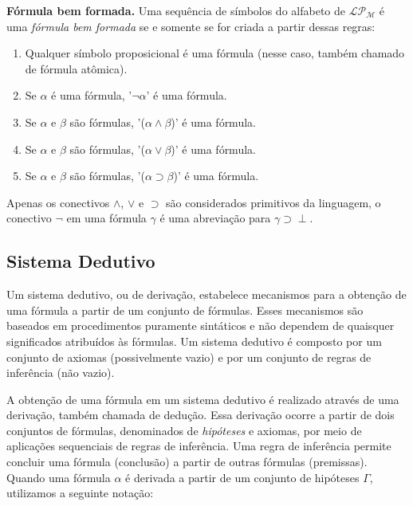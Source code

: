 \begin{definition}{\textbf{Fórmula bem formada.}}
Uma sequência de símbolos do alfabeto de $\mathcal{LP_M}$ é uma \textit{fórmula bem formada} se e somente se for criada a partir dessas regras:
\begin{enumerate}
    \item Qualquer símbolo proposicional é uma fórmula (nesse caso, também chamado de fórmula atômica).
    \item Se $\alpha$ é uma fórmula, '$\neg\alpha$' é uma fórmula.
    \item Se $\alpha$ e $\beta$ são fórmulas, '($\alpha \land \beta$)' é uma fórmula.
    \item Se $\alpha$ e $\beta$ são fórmulas, '($\alpha \lor \beta$)' é uma fórmula.
    \item Se $\alpha$ e $\beta$ são fórmulas, '($\alpha \supset \beta$)' é uma fórmula.
\end{enumerate}
\end{definition}

Apenas os conectivos $\land$, $\lor$ e $\supset$ são considerados primitivos da linguagem, o conectivo $\neg$ em uma fórmula $\gamma$ é uma abreviação para $\gamma \supset \perp$.

\subsection{Sistema Dedutivo}

Um sistema dedutivo, ou de derivação, estabelece mecanismos para a obtenção de uma fórmula a partir de um conjunto de fórmulas. Esses mecanismos são baseados em procedimentos puramente sintáticos e não dependem de quaisquer significados atribuídos às fórmulas. Um sistema dedutivo é composto por um conjunto de axiomas (possivelmente vazio) e por um conjunto de regras de inferência (não vazio).

A obtenção de uma fórmula em um sistema dedutivo é realizado através de uma derivação, também chamada de dedução. Essa derivação ocorre a partir de dois conjuntos de fórmulas, denominados de \textit{hipóteses} e axiomas, por meio de aplicações sequenciais de regras de inferência. Uma regra de inferência permite concluir uma fórmula (conclusão) a partir de outras fórmulas (premissas). Quando uma fórmula $\alpha$ é derivada a partir de um conjunto de hipóteses $\Gamma$, utilizamos a seguinte notação:

